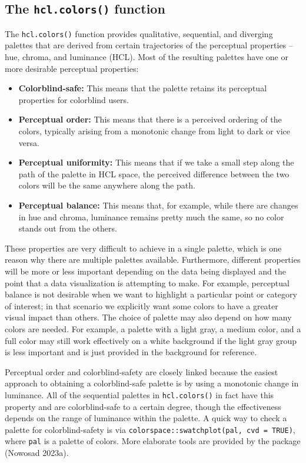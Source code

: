 \hypertarget{the-hcl.colors-function-1}{%
\subsection{\texorpdfstring{The \texttt{hcl.colors()} function}{The hcl.colors() function}}\label{the-hcl.colors-function-1}}

The \texttt{hcl.colors()} function provides
qualitative, sequential, and diverging palettes that are derived from
certain trajectories of the perceptual properties -- hue, chroma, and luminance
(HCL). Most of the resulting palettes have one
or more desirable perceptual properties:

\begin{itemize}
\tightlist
\item
  \textbf{Colorblind-safe:} This means that the palette retains
  its perceptual properties for colorblind users.
\item
  \textbf{Perceptual order:} This means that there is a perceived ordering
  of the colors, typically arising from a monotonic change from
  light to dark or vice versa.
\item
  \textbf{Perceptual uniformity:} This means that if we take a small step along
  the path of the palette in HCL space, the perceived difference
  between the two colors will be the same anywhere along the path.
\item
  \textbf{Perceptual balance:} This means that, for example,
  while there are changes in hue and chroma, luminance remains
  pretty much the same, so no color stands out from the others.
\end{itemize}

These properties are very difficult to achieve in
a single palette, which is one reason why there are multiple palettes
available. Furthermore, different properties will be more or less
important depending on the data being displayed and the point that
a data visualization is attempting to make. For example, perceptual
balance is not desirable when we want to highlight a particular
point or category of interest; in that scenario we explicitly
want some colors to have a greater visual impact than others.
The choice of palette may also depend on how many colors are needed. For
example, a palette with a light gray, a medium color, and a full color may still
work effectively on a white background if the
light gray group is less important and
is just provided in the background for
reference.

Perceptual order and colorblind-safety are closely linked
because the easiest approach to obtaining
a colorblind-safe palette is by using a monotonic
change in luminance. All of the sequential palettes in \texttt{hcl.colors()} in
fact have this property and are colorblind-safe to a certain degree, though
the effectiveness
depends on the range of luminance within the palette.
A quick way to check a palette for colorblind-safety is via
\texttt{colorspace::swatchplot(pal,\ cvd\ =\ TRUE)}, where \texttt{pal} is a palette of colors.
More elaborate tools
are provided by the package  (Nowosad 2023a).

